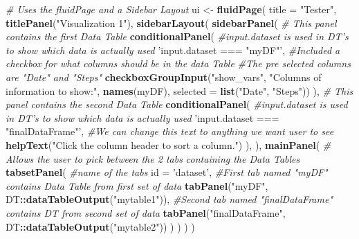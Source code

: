 \documentclass[]{book}
\newenvironment{Shaded}{\begin{snugshade}}{\end{snugshade}}
\newcommand{\CommentTok}[1]{\textcolor[rgb]{0.56,0.35,0.01}{\textit{#1}}}
\newcommand{\DataTypeTok}[1]{\textcolor[rgb]{0.13,0.29,0.53}{#1}}
\newcommand{\KeywordTok}[1]{\textcolor[rgb]{0.13,0.29,0.53}{\textbf{#1}}}
\newcommand{\NormalTok}[1]{#1}
\newcommand{\OperatorTok}[1]{\textcolor[rgb]{0.81,0.36,0.00}{\textbf{#1}}}
\newcommand{\StringTok}[1]{\textcolor[rgb]{0.31,0.60,0.02}{#1}}
\begin{document}
\begin{Shaded}
\begin{Highlighting}[]
\CommentTok{# Uses the fluidPage and a Sidebar Layout}
\NormalTok{ui <-}\StringTok{ }\KeywordTok{fluidPage}\NormalTok{(}
  \DataTypeTok{title =} \StringTok{"Tester"}\NormalTok{,}
  \KeywordTok{titlePanel}\NormalTok{(}\StringTok{"Visualization 1"}\NormalTok{),}
  \KeywordTok{sidebarLayout}\NormalTok{(}
    \KeywordTok{sidebarPanel}\NormalTok{(}
      \CommentTok{# This panel contains the first Data Table}
      \KeywordTok{conditionalPanel}\NormalTok{(}
        \CommentTok{#input.dataset is used in DT's to show which data is actually used}
        \StringTok{'input.dataset === "myDF"'}\NormalTok{,}
        \CommentTok{#Included a checkbox for what columns should be in the data Table}
        \CommentTok{#The pre selected columns are "Date" and "Steps"}
        \KeywordTok{checkboxGroupInput}\NormalTok{(}\StringTok{"show_vars"}\NormalTok{, }\StringTok{"Columns of information to show:"}\NormalTok{,}
                           \KeywordTok{names}\NormalTok{(myDF), }\DataTypeTok{selected =} \KeywordTok{list}\NormalTok{(}\StringTok{"Date"}\NormalTok{, }\StringTok{"Steps"}\NormalTok{))}
\NormalTok{      ),}
      \CommentTok{# This panel contains the second Data Table}
      \KeywordTok{conditionalPanel}\NormalTok{(}
        \CommentTok{#input.dataset is used in DT's to show which data is actually used}
        \StringTok{'input.dataset === "finalDataFrame"'}\NormalTok{,}
        \CommentTok{#We can change this text to anything we want user to see}
        \KeywordTok{helpText}\NormalTok{(}\StringTok{"Click the column header to sort a column."}\NormalTok{)}
\NormalTok{      ),}
\NormalTok{    ),}
    \KeywordTok{mainPanel}\NormalTok{(}
      \CommentTok{# Allows the user to pick between the 2 tabs containing the Data Tables}
      \KeywordTok{tabsetPanel}\NormalTok{(}
        \CommentTok{#name of the tabs}
        \DataTypeTok{id =} \StringTok{'dataset'}\NormalTok{,}
        \CommentTok{#First tab named "myDF" contains Data Table from first set of data}
        \KeywordTok{tabPanel}\NormalTok{(}\StringTok{"myDF"}\NormalTok{, DT}\OperatorTok{::}\KeywordTok{dataTableOutput}\NormalTok{(}\StringTok{"mytable1"}\NormalTok{)),}
        \CommentTok{#Second tab named "finalDataFrame" contains DT from second set of data}
        \KeywordTok{tabPanel}\NormalTok{(}\StringTok{"finalDataFrame"}\NormalTok{, DT}\OperatorTok{::}\KeywordTok{dataTableOutput}\NormalTok{(}\StringTok{"mytable2"}\NormalTok{))}
\NormalTok{      )}
\NormalTok{    )}
\NormalTok{  )}
\NormalTok{)}
\end{Highlighting}
\end{Shaded}
\end{document}
